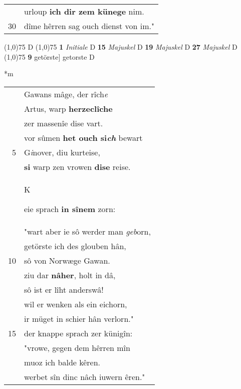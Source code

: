 \documentclass[8pt,a4paper,notitlepage]{article}
\begin{document}
\begin{table}[ht]
\begin{minipage}[t]{0.5\linewidth}
\begin{tabular}{rl}
 & urloup \textbf{ich dir zem künege} nim.\\ 
30 & dîme hêrren sag ouch dienst von im."\\ 
\end{tabular}
\scriptsize
\line(1,0){75} \newline
D \newline
\line(1,0){75} \newline
\textbf{1} \textit{Initiale} D  \textbf{15} \textit{Majuskel} D  \textbf{19} \textit{Majuskel} D  \textbf{27} \textit{Majuskel} D  \newline
\line(1,0){75} \newline
\textbf{9} getörste] getorste D \newline
\end{minipage}
\hspace{0.5cm}
\begin{minipage}[t]{0.5\linewidth}
\small
\begin{center}*m
\end{center}
\begin{tabular}{rl}
 & Gawans mâge, der rîch\textit{e}\\ 
 & Artus, warp \textbf{herzeclîche}\\ 
 & zer massenîe dise vart.\\ 
 & vor sûmen \textbf{het ouch si\textit{ch}} bewart\\ 
5 & G\textit{i}nover, diu kurteise,\\ 
 & \textbf{si} warp zen vrowen \textbf{dise} reise.\\ 
 & \begin{large}K\end{large}eie sprach \textbf{in sînem} zorn:\\ 
 & "wart aber ie sô werder man \textit{geb}orn,\\ 
 & getörste ich des glouben hân,\\ 
10 & sô von Norwæge Gawan.\\ 
 & ziu dar \textbf{nâher}, holt in dâ,\\ 
 & sô ist er lîht anderswâ!\\ 
 & wil er wenken als ein eichorn,\\ 
 & ir müget in schier hân verlorn."\\ 
15 & der knappe sprach zer künigîn:\\ 
 & "vrowe, gegen dem hêrren mîn\\ 
 & muoz ich balde kêren.\\ 
 & werbet sîn dinc nâch iuwern êren."\\ 

\end{tabular}
\end{minipage}
\end{table}
\end{document}
